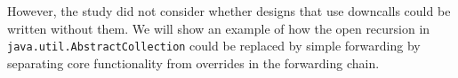 \documentclass[preprint,10pt]{sigplanconf}
\begin{document}
However, the study did not consider whether designs that use
downcalls could be written without them.  We will show an example
of how the open recursion in \texttt{java.util.AbstractCollection}
could be replaced by simple forwarding by separating core
functionality from overrides in the forwarding chain.






\end{document}

